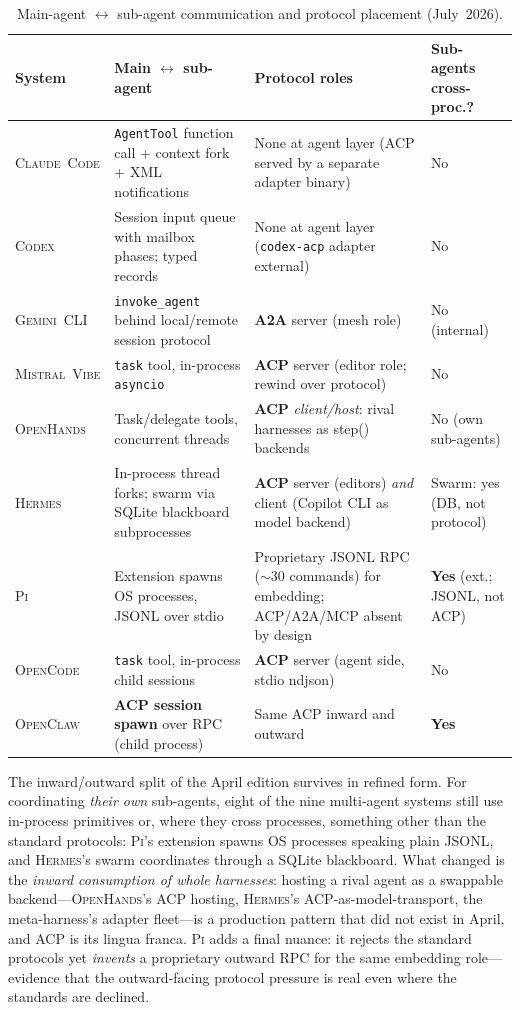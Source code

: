 \documentclass[11pt,a4paper]{article}
\newcommand{\clcode}{\textsc{Claude~Code}\xspace}
\newcommand{\cdx}{\textsc{Codex}\xspace}
\newcommand{\oh}{\textsc{OpenHands}\xspace}
\newcommand{\ocl}{\textsc{OpenClaw}\xspace}
\newcommand{\vibe}{\textsc{Mistral~Vibe}\xspace}
\newcommand{\gemini}{\textsc{Gemini~CLI}\xspace}
\newcommand{\hrm}{\textsc{Hermes}\xspace}
\newcommand{\pib}{\textsc{Pi}\xspace}
\newcommand{\ocd}{\textsc{OpenCode}\xspace}
\begin{document}
\begin{table}[H]
\centering
\caption{Main-agent $\leftrightarrow$ sub-agent communication and protocol placement (July~2026).}
\label{tab:inter_agent_layers}
\scriptsize
\renewcommand{\arraystretch}{1.25}
\begin{tabularx}{\textwidth}{@{}l L{4.0cm} L{4.6cm} L{2.2cm}@{}}
\toprule
\textbf{System} & \textbf{Main $\leftrightarrow$ sub-agent} & \textbf{Protocol roles} & \textbf{Sub-agents cross-proc.?} \\
\midrule
\clcode{}  & \texttt{AgentTool} function call + context fork + XML notifications & None at agent layer (ACP served by a separate adapter binary) & No \\
\cdx{}     & Session input queue with mailbox phases; typed records & None at agent layer (\texttt{codex-acp} adapter external) & No \\
\gemini{}  & \texttt{invoke\_agent} behind local/remote session protocol & \textbf{A2A} server (mesh role) & No (internal) \\
\vibe{}    & \texttt{task} tool, in-process \texttt{asyncio} & \textbf{ACP} server (editor role; rewind over protocol) & No \\
\oh{}      & Task/delegate tools, concurrent threads & \textbf{ACP} \emph{client/host}: rival harnesses as step() backends & No (own sub-agents) \\
\hrm{}     & In-process thread forks; swarm via SQLite blackboard subprocesses & \textbf{ACP} server (editors) \emph{and} client (Copilot CLI as model backend) & Swarm: yes (DB, not protocol) \\
\pib{}     & Extension spawns OS processes, JSONL over stdio & Proprietary JSONL RPC ($\sim$30 commands) for embedding; ACP/A2A/MCP absent by design & \textbf{Yes} (ext.; JSONL, not ACP) \\
\ocd{}     & \texttt{task} tool, in-process child sessions & \textbf{ACP} server (agent side, stdio ndjson) & No \\
\ocl{}     & \textbf{ACP session spawn} over RPC (child process) & Same ACP inward and outward & \textbf{Yes} \\
\bottomrule
\end{tabularx}
\end{table}

The inward/outward split of the April edition survives in refined form.
For coordinating \emph{their own} sub-agents, eight of the nine multi-agent systems still use in-process primitives or, where they cross processes, something other than the standard protocols: \pib{}'s extension spawns OS processes speaking plain JSONL, and \hrm{}'s swarm coordinates through a SQLite blackboard.
What changed is the \emph{inward consumption of whole harnesses}: hosting a rival agent as a swappable backend---\oh{}'s ACP hosting, \hrm{}'s ACP-as-model-transport, the meta-harness's adapter fleet---is a production pattern that did not exist in April, and ACP is its lingua franca.
\pib{} adds a final nuance: it rejects the standard protocols yet \emph{invents} a proprietary outward RPC for the same embedding role---evidence that the outward-facing protocol pressure is real even where the standards are declined.
\end{document}
